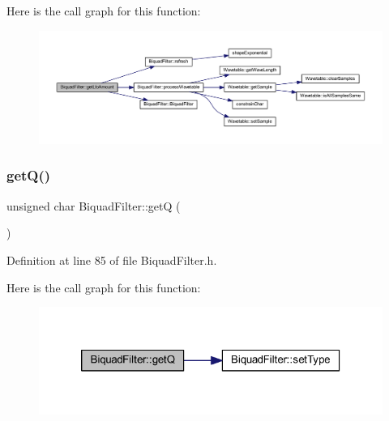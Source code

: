 Here is the call graph for this function\+:
\nopagebreak
\begin{figure}[H]
\begin{center}
\leavevmode
\includegraphics[width=350pt]{d9/d6f/class_biquad_filter_aa6cee8e0caed47a12edb5f58b40b0561_cgraph}
\end{center}
\end{figure}
\mbox{\label{class_biquad_filter_a579a1df530fc036f7d8a28e38b1f760c}} 
\subsubsection{\texorpdfstring{get\+Q()}{getQ()}}
{\footnotesize\ttfamily unsigned char Biquad\+Filter\+::getQ (\begin{DoxyParamCaption}{ }\end{DoxyParamCaption})\hspace{0.3cm}{\ttfamily [inline]}}



Definition at line 85 of file Biquad\+Filter.\+h.

Here is the call graph for this function\+:
\nopagebreak
\begin{figure}[H]
\begin{center}
\leavevmode
\includegraphics[width=320pt]{d9/d6f/class_biquad_filter_a579a1df530fc036f7d8a28e38b1f760c_cgraph}
\end{center}
\end{figure}
\mbox{\label{class_biquad_filter_ad77052398310ede2df2ba664259317d9}} 

